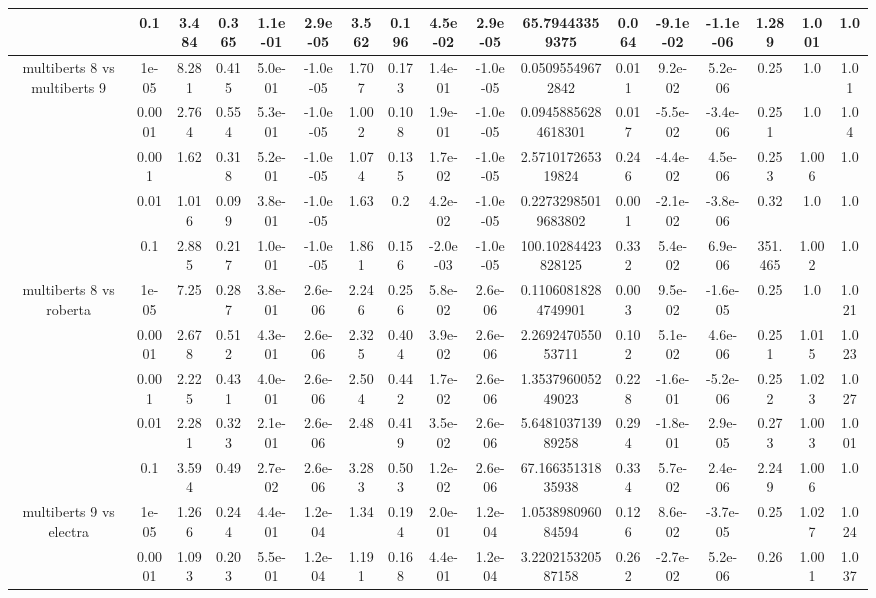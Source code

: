 \begin{tabular}{|c|c|c|c|c|c|c|c|c|c|c|c|c|c|c|c|c|}
 & 0.1 & 3.484 & 0.365 & 1.1e-01 & 2.9e-05 & 3.562 & 0.196 & 4.5e-02 & 2.9e-05 & 65.79443359375 & 0.064 & -9.1e-02 & -1.1e-06 & 1.289 & 1.001 & 1.0 \\
\hline
\multirow{5}{*}{multiberts 8 vs multiberts 9} & 1e-05 & 8.281 & 0.415 & 5.0e-01 & -1.0e-05 & 1.707 & 0.173 & 1.4e-01 & -1.0e-05 & 0.05095549672842 & 0.011 & 9.2e-02 & 5.2e-06 & 0.25 & 1.0 & 1.01 \\
 & 0.0001 & 2.764 & 0.554 & 5.3e-01 & -1.0e-05 & 1.002 & 0.108 & 1.9e-01 & -1.0e-05 & 0.09458856284618301 & 0.017 & -5.5e-02 & -3.4e-06 & 0.251 & 1.0 & 1.04 \\
 & 0.001 & 1.62 & 0.318 & 5.2e-01 & -1.0e-05 & 1.074 & 0.135 & 1.7e-02 & -1.0e-05 & 2.571017265319824 & 0.246 & -4.4e-02 & 4.5e-06 & 0.253 & 1.006 & 1.0 \\
 & 0.01 & 1.016 & 0.099 & 3.8e-01 & -1.0e-05 & 1.63 & 0.2 & 4.2e-02 & -1.0e-05 & 0.22732985019683802 & 0.001 & -2.1e-02 & -3.8e-06 & 0.32 & 1.0 & 1.0 \\
 & 0.1 & 2.885 & 0.217 & 1.0e-01 & -1.0e-05 & 1.861 & 0.156 & -2.0e-03 & -1.0e-05 & 100.10284423828125 & 0.332 & 5.4e-02 & 6.9e-06 & 351.465 & 1.002 & 1.0 \\
\hline
\multirow{5}{*}{multiberts 8 vs roberta } & 1e-05 & 7.25 & 0.287 & 3.8e-01 & 2.6e-06 & 2.246 & 0.256 & 5.8e-02 & 2.6e-06 & 0.11060818284749901 & 0.003 & 9.5e-02 & -1.6e-05 & 0.25 & 1.0 & 1.021 \\
 & 0.0001 & 2.678 & 0.512 & 4.3e-01 & 2.6e-06 & 2.325 & 0.404 & 3.9e-02 & 2.6e-06 & 2.269247055053711 & 0.102 & 5.1e-02 & 4.6e-06 & 0.251 & 1.015 & 1.023 \\
 & 0.001 & 2.225 & 0.431 & 4.0e-01 & 2.6e-06 & 2.504 & 0.442 & 1.7e-02 & 2.6e-06 & 1.353796005249023 & 0.228 & -1.6e-01 & -5.2e-06 & 0.252 & 1.023 & 1.027 \\
 & 0.01 & 2.281 & 0.323 & 2.1e-01 & 2.6e-06 & 2.48 & 0.419 & 3.5e-02 & 2.6e-06 & 5.648103713989258 & 0.294 & -1.8e-01 & 2.9e-05 & 0.273 & 1.003 & 1.001 \\
 & 0.1 & 3.594 & 0.49 & 2.7e-02 & 2.6e-06 & 3.283 & 0.503 & 1.2e-02 & 2.6e-06 & 67.16635131835938 & 0.334 & 5.7e-02 & 2.4e-06 & 2.249 & 1.006 & 1.0 \\
\hline
\multirow{5}{*}{multiberts 9 vs electra } & 1e-05 & 1.266 & 0.244 & 4.4e-01 & 1.2e-04 & 1.34 & 0.194 & 2.0e-01 & 1.2e-04 & 1.053898096084594 & 0.126 & 8.6e-02 & -3.7e-05 & 0.25 & 1.027 & 1.024 \\
 & 0.0001 & 1.093 & 0.203 & 5.5e-01 & 1.2e-04 & 1.191 & 0.168 & 4.4e-01 & 1.2e-04 & 3.220215320587158 & 0.262 & -2.7e-02 & 5.2e-06 & 0.26 & 1.001 & 1.037 \\

\end{tabular}
